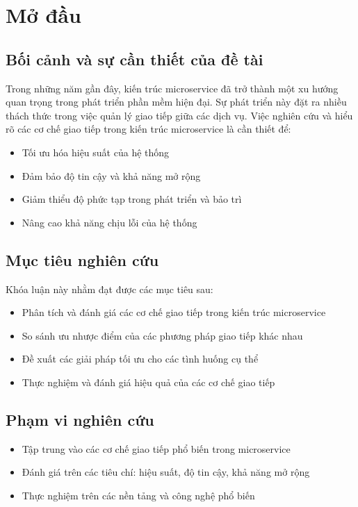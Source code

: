 \chapter{Mở đầu}

\section{Bối cảnh và sự cần thiết của đề tài}
Trong những năm gần đây, kiến trúc microservice đã trở thành một xu hướng quan trọng trong phát triển phần mềm hiện đại. Sự phát triển này đặt ra nhiều thách thức trong việc quản lý giao tiếp giữa các dịch vụ. Việc nghiên cứu và hiểu rõ các cơ chế giao tiếp trong kiến trúc microservice là cần thiết để:

\begin{itemize}
    \item Tối ưu hóa hiệu suất của hệ thống
    \item Đảm bảo độ tin cậy và khả năng mở rộng
    \item Giảm thiểu độ phức tạp trong phát triển và bảo trì
    \item Nâng cao khả năng chịu lỗi của hệ thống
\end{itemize}

\section{Mục tiêu nghiên cứu}
Khóa luận này nhằm đạt được các mục tiêu sau:

\begin{itemize}
    \item Phân tích và đánh giá các cơ chế giao tiếp trong kiến trúc microservice
    \item So sánh ưu nhược điểm của các phương pháp giao tiếp khác nhau
    \item Đề xuất các giải pháp tối ưu cho các tình huống cụ thể
    \item Thực nghiệm và đánh giá hiệu quả của các cơ chế giao tiếp
\end{itemize}

\section{Phạm vi nghiên cứu}
\begin{itemize}
    \item Tập trung vào các cơ chế giao tiếp phổ biến trong microservice
    \item Đánh giá trên các tiêu chí: hiệu suất, độ tin cậy, khả năng mở rộng
    \item Thực nghiệm trên các nền tảng và công nghệ phổ biến
\end{itemize}

